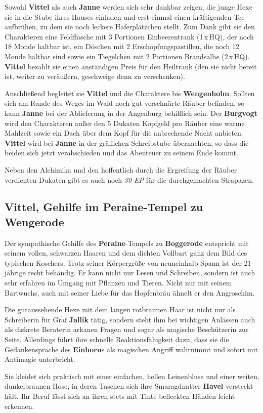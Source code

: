 Sowohl \textbf{Vittel} als auch \textbf{Janne} werden sich sehr dankbar zeigen, die junge Hexe sie in die Stube ihres Hauses einladen und erst einmal einen kräftigenden Tee aufbrühen, zu dem sie noch leckere Haferplätzchen stellt.
Zum Dank gibt sie den Charakteren eine Feldflasche mit 3 Portionen Einbeerentrank (1\,x\,HQ), der noch 18 Monde haltbar ist, ein Döschen mit 2 Erschöpfungspastillen, die noch 12 Monde haltbar sind sowie ein Tiegelchen mit 2 Portionen Brandsalbe (2\,x\,HQ).
\textbf{Vittel} bezahlt sie einen anständigen Preis für den Heiltrank (den sie nicht bereit ist, weiter zu veräußern, geschweige denn zu verschenken).


Anschließend begleitet sie \textbf{Vittel} und die Charaktere bis \textbf{Wengenholm}.
Sollten sich am Rande des Weges im Wald noch gut verschnürte Räuber befinden, so kann \textbf{Janne} bei der Ablieferung in der Angenburg behilflich sein.
Der \textbf{Burgvogt} wird den Charakteren außer den 5 Dukaten Kopfgeld pro Räuber eine warme Mahlzeit sowie ein Dach über dem Kopf für die anbrechende Nacht anbieten.
\textbf{Vittel} wird bei \textbf{Janne} in der gräflichen Schreibstube übernachten, so dass die beiden sich jetzt verabschieden und das Abenteuer zu seinem Ende kommt. 

Neben den Alchimika und den hoffentlich durch die Ergreifung der Räuber verdienten Dukaten gibt es auch noch \textit{30 EP} für die durchgemachten Strapazen.

\neuespalte


\subsection[Vittel, Gehilfe im Peraine-Tempel]{Vittel, Gehilfe im Peraine-Tempel zu Wengerode}
Der sympathische Gehilfe des \textbf{Peraine}-Tempels zu \textbf{Boggerode} entspricht mit seinem vollen, schwarzen Haaren und dem dichten Vollbart ganz dem Bild des typischen Koschers.
Trotz seiner Körpergröße von neuneinhalb Spann ist der 21-jährige recht behändig.
Er kann nicht nur Lesen und Schreiben, sondern ist auch sehr erfahren im Umgang mit Pflanzen und Tieren.
Nicht nur mit seinem Bartwuchs, auch mit seiner Liebe für das Hopfenbräu ähnelt er den Angroschim.


Die gutaussehende Hexe mit dem langen rotbraunen Haar ist nicht nur als Schreiberin für Graf \textbf{Jallik} tätig, sondern steht ihm bei wichtigen Anlässen auch als diskrete Beraterin arkanen Fragen und sogar als magische Beschützerin zur Seite. Allerdings führt ihre schnelle Reaktionsfähigkeit dazu, dass sie die Gedankensprache des \textbf{Einhorn}s als magischen Angriff wahrnimmt und sofort mit Antimagie unterbricht.

Sie kleidet sich praktisch mit einer einfachen, hellen Leinenbluse und einer weiten, dunkelbraunen Hose, in deren Taschen sich ihre Smaragdnatter \textbf{Havel} versteckt hält. Ihr Beruf lässt sich an ihren stets mit Tinte befleckten Händen leicht erkennen.

\spaltenende